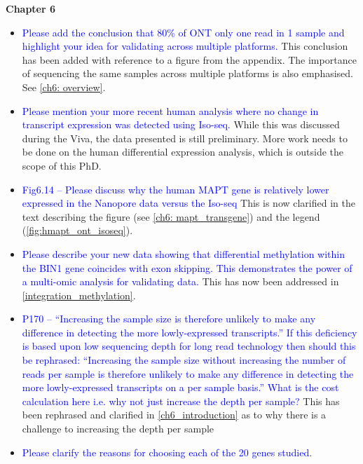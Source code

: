 \documentclass[a4paper,12pt,oneside]{report}
\begin{document}
\vspace{1cm}
\textbf{Chapter 6}
\begin{itemize}
	\item \textcolor{blue}{Please add the conclusion that 80\% of ONT only one read in 1 sample and highlight your idea for validating across multiple platforms.}
	\newline This conclusion has been added with reference to a figure from the appendix. The importance of sequencing the same samples across multiple platforms is also emphasised. See \cref{ch6: overview}.
	\item \textcolor{blue}{Please mention your more recent human analysis where no change in transcript expression was detected using Iso-seq.}
	\newline While this was discussed during the Viva, the data presented is still preliminary. More work needs to be done on the human differential expression analysis, which is outside the scope of this PhD. 
	\item \textcolor{blue}{Fig6.14 – Please discuss why the human MAPT gene is relatively lower expressed in the Nanopore data versus the Iso-seq}
	\newline This is now clarified in the text describing the figure (see \cref{ch6: mapt_transgene}) and the legend (\cref{fig:hmapt_ont_isoseq}).
	\item \textcolor{blue}{Please describe your new data showing that differential methylation within the BIN1 gene coincides with exon skipping. This demonstrates the power of a multi-omic analysis for validating data.}
	\newline This has now been addressed in \cref{integration_methylation}.
	\item \textcolor{blue}{P170 – “Increasing the sample size is therefore unlikely to make any difference in detecting the more lowly-expressed transcripts.” If this deficiency is based upon low sequencing depth for long read technology then should this be rephrased: “Increasing the sample size without increasing the number of reads per sample is therefore unlikely to make any difference in detecting the more lowly-expressed transcripts on a per sample basis.” What is the cost calculation here i.e. why not just increase the depth per sample?} 
	\newline This has been rephrased and clarified in \cref{ch6_introduction} as to why there is a challenge to increasing the depth per sample
	\item \textcolor{blue}{Please clarify the reasons for choosing each of the 20 genes studied.}

\end{itemize}
\end{document}
